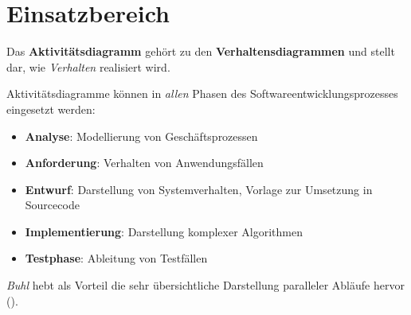 \section{Einsatzbereich}

Das \textbf{Aktivitätsdiagramm} gehört zu den \textbf{Verhaltensdiagrammen} und stellt dar, wie \textit{Verhalten} realisiert wird.\\

\begin{tcolorbox}[title=Einsatzbereich]
Aktivitätsdiagramme können in \textit{allen} Phasen des Softwareentwicklungsprozesses eingesetzt werden:

\begin{itemize}
    \item \textbf{Analyse}: Modellierung von Geschäftsprozessen
    \item \textbf{Anforderung}: Verhalten von Anwendungsfällen
    \item \textbf{Entwurf}: Darstellung von Systemverhalten, Vorlage zur Umsetzung in Sourcecode
    \item \textbf{Implementierung}: Darstellung komplexer Algorithmen
    \item \textbf{Testphase}: Ableitung von Testfällen
\end{itemize}
\end{tcolorbox}

\noindent
\textit{Buhl} hebt als Vorteil die sehr übersichtliche Darstellung paralleler Abläufe hervor (\cite[57]{Buh09}).